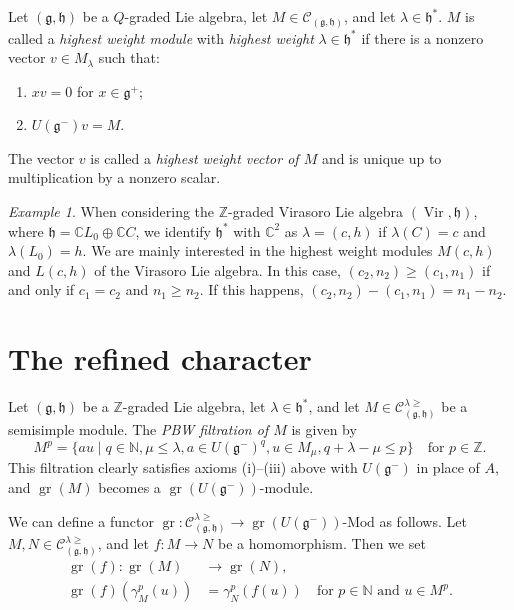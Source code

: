 \documentclass[a4paper, 12pt, reqno]{amsart}
\theoremstyle{remark}
\newtheorem{example}[theorem]{Example}
\DeclareMathOperator{\Vir}{Vir}
\DeclareMathOperator{\gr}{gr}
\begin{document}
Let $(\mathfrak{g}, \mathfrak{h})$ be a $Q$-graded Lie algebra, let $M \in \mathcal{C}_{(\mathfrak{g}, \mathfrak{h})}$, and let $\lambda \in \mathfrak{h}^*$.
$M$ is called a \emph{highest weight module} with \emph{highest weight} $\lambda \in \mathfrak{h}^*$ if there is a nonzero vector $v \in M_{\lambda}$ such that:
\begin{enumerate}
\item $xv = 0$ for $x \in \mathfrak{g}^+$;
\item $U(\mathfrak{g}^-)v = M$.
\end{enumerate}
The vector $v$ is called a \emph{highest weight vector of $M$} and is unique up to multiplication by a nonzero scalar.

\begin{example}
  \label{exa:3}
  When considering the $\mathbb{Z}$-graded Virasoro Lie algebra $(\Vir, \mathfrak{h})$, where $\mathfrak{h} = \mathbb{C}L_0 \oplus \mathbb{C}C$, we identify $\mathfrak{h}^*$ with $\mathbb{C}^2$ as $\lambda = (c, h)$ if $\lambda(C) = c$ and $\lambda(L_0) = h$.
  We are mainly interested in the highest weight modules $M(c, h)$ and $L(c, h)$ of the Virasoro Lie algebra.
  In this case, $(c_2, n_2) \ge (c_1, n_1)$ if and only if $c_1 = c_2$ and $n_1 \ge n_2$.
  If this happens, $(c_2, n_2) - (c_1, n_1) = n_1 - n_2$.
\end{example}

\section{The refined character}
\label{sec:refined-character}

Let $(\mathfrak{g}, \mathfrak{h})$ be a $\mathbb{Z}$-graded Lie algebra, let $\lambda \in \mathfrak{h}^*$, and let $M \in \mathcal{C}^{\lambda \ge}_{(\mathfrak{g}, \mathfrak{h})}$ be a semisimple module.
The \emph{PBW filtration of $M$} is given by
\begin{equation*}
  M^p = \{au \mid q \in \mathbb{N}, \mu \le \lambda, a \in U(\mathfrak{g}^-)^q, u \in M_{\mu}, q + \lambda - \mu \le p\} \quad \text{for $p \in \mathbb{Z}$}.
\end{equation*}
This filtration clearly satisfies axioms (i)--(iii) above with $U(\mathfrak{g}^-)$ in place of $A$, and $\gr(M)$ becomes a $\gr(U(\mathfrak{g^-}))$-module.

We can define a functor $\gr: \mathcal{C}^{\lambda \ge}_{(\mathfrak{g}, \mathfrak{h})} \to \gr(U(\mathfrak{g}^-))\text{-Mod}$ as follows.
Let $M, N \in \mathcal{C}^{\lambda \ge}_{(\mathfrak{g}, \mathfrak{h})}$, and let $f: M \to N$ be a homomorphism.
Then we set
\begin{align*}
  \gr(f): \gr(M) &\to \gr(N), \\
  \gr(f)(\gamma_M^p(u)) &= \gamma_N^p(f(u)) \quad \text{for $p \in \mathbb{N}$ and $u \in M^p$}.
\end{align*}
\end{document}
